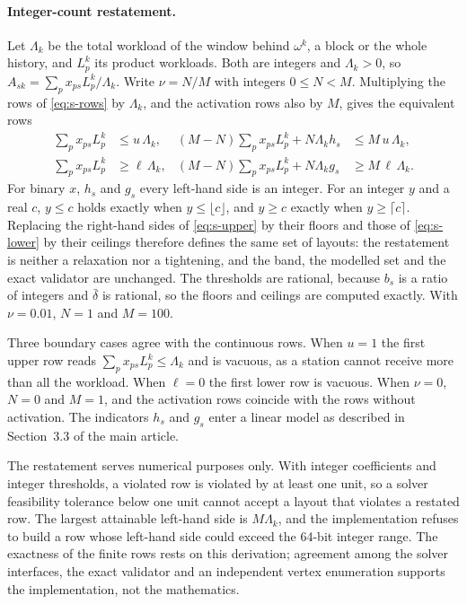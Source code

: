 \documentclass[11pt]{article}
\begin{document}
\paragraph{Integer-count restatement.} Let $\Lambda_k$ be the total workload of the window behind $\omega^k$, a block or the whole history, and $L^k_p$ its product workloads. Both are integers and $\Lambda_k>0$, so $A_{sk}=\sum_px_{ps}L^k_p/\Lambda_k$. Write $\nu=N/M$ with integers $0\le N<M$. Multiplying the rows of \eqref{eq:s-rows} by $\Lambda_k$, and the activation rows also by $M$, gives the equivalent rows
\begin{align}
\textstyle\sum_px_{ps}L^k_p &\le u\,\Lambda_k, & (M-N)\textstyle\sum_px_{ps}L^k_p+N\Lambda_kh_s &\le M\,u\,\Lambda_k, \label{eq:s-upper}\\
\textstyle\sum_px_{ps}L^k_p &\ge \ell\,\Lambda_k, & (M-N)\textstyle\sum_px_{ps}L^k_p+N\Lambda_kg_s &\ge M\,\ell\,\Lambda_k. \label{eq:s-lower}
\end{align}
For binary $x$, $h_s$ and $g_s$ every left-hand side is an integer. For an integer $y$ and a real $c$, $y\le c$ holds exactly when $y\le\lfloor c\rfloor$, and $y\ge c$ exactly when $y\ge\lceil c\rceil$. Replacing the right-hand sides of \eqref{eq:s-upper} by their floors and those of \eqref{eq:s-lower} by their ceilings therefore defines the same set of layouts: the restatement is neither a relaxation nor a tightening, and the band, the modelled set and the exact validator are unchanged. The thresholds are rational, because $b_s$ is a ratio of integers and $\bar\delta$ is rational, so the floors and ceilings are computed exactly. With $\nu=0.01$, $N=1$ and $M=100$.

Three boundary cases agree with the continuous rows. When $u=1$ the first upper row reads $\sum_px_{ps}L^k_p\le\Lambda_k$ and is vacuous, as a station cannot receive more than all the workload. When $\ell=0$ the first lower row is vacuous. When $\nu=0$, $N=0$ and $M=1$, and the activation rows coincide with the rows without activation. The indicators $h_s$ and $g_s$ enter a linear model as described in Section~3.3 of the main article.

The restatement serves numerical purposes only. With integer coefficients and integer thresholds, a violated row is violated by at least one unit, so a solver feasibility tolerance below one unit cannot accept a layout that violates a restated row. The largest attainable left-hand side is $M\Lambda_k$, and the implementation refuses to build a row whose left-hand side could exceed the 64-bit integer range. The exactness of the finite rows rests on this derivation; agreement among the solver interfaces, the exact validator and an independent vertex enumeration supports the implementation, not the mathematics.
\end{document}
